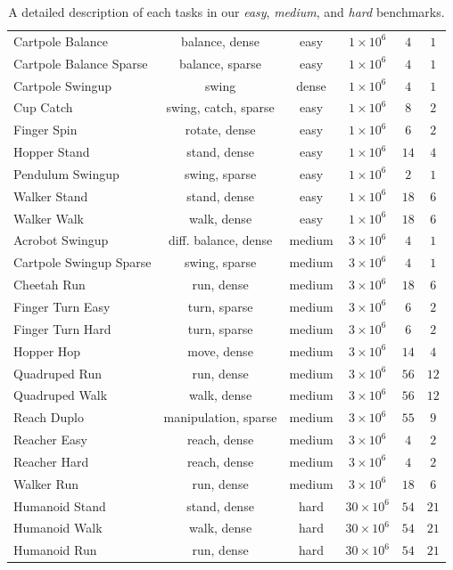 \begin{table}[!h]
\begin{tabular}{lccccc}
\hline
Cartpole Balance & balance, dense & easy & $1\times 10^6$  & $4$ & $1$  \\
Cartpole Balance Sparse & balance, sparse & easy & $1\times 10^6$  & $4$ & $1$  \\
Cartpole Swingup & swing & dense & $1\times 10^6$  & $4$ & $1$ \\
Cup Catch & swing, catch, sparse & easy & $1\times 10^6$  & $8$ & $2$ \\
Finger Spin & rotate, dense & easy & $1\times 10^6$  & $6$ & $2$ \\
Hopper Stand & stand, dense & easy & $1\times 10^6$  & $14$ & $4$ \\
Pendulum Swingup & swing, sparse & easy & $1\times 10^6$  & $2$ & $1$ \\
Walker Stand  & stand, dense & easy & $1\times 10^6$  & $18$ & $6$\\
Walker Walk  & walk, dense & easy & $1\times 10^6$  & $18$ & $6$ \\
\hline 
Acrobot Swingup & diff. balance, dense & medium & $3\times 10^6$  & $4$ & $1$  \\
Cartpole Swingup Sparse & swing, sparse & medium & $3\times 10^6$  & $4$ & $1$  \\
Cheetah Run & run, dense & medium & $3\times 10^6$  & $18$ & $6$  \\
Finger Turn Easy & turn, sparse & medium & $3\times 10^6$  & $6$ & $2$  \\
Finger Turn Hard & turn, sparse & medium & $3\times 10^6$  & $6$ & $2$  \\
Hopper Hop & move, dense & medium & $3\times 10^6$  & $14$ & $4$  \\
Quadruped Run & run, dense & medium & $3\times 10^6$  & $56$ & $12$  \\
Quadruped Walk & walk, dense & medium & $3\times 10^6$  & $56$ & $12$  \\
Reach Duplo & manipulation, sparse & medium & $3\times 10^6$  & $55$ & $9$  \\
Reacher Easy & reach, dense & medium & $3\times 10^6$  & $4$ & $2$  \\
Reacher Hard & reach, dense & medium & $3\times 10^6$  & $4$ & $2$  \\
Walker Run & run, dense & medium & $3\times 10^6$  & $18$ & $6$  \\
\hline
Humanoid Stand & stand, dense & hard & $30\times 10^6$  & $54$ & $21$  \\
Humanoid Walk & walk, dense & hard & $30\times 10^6$  & $54$ & $21$  \\
Humanoid Run & run, dense & hard & $30\times 10^6$  & $54$ & $21$  \\


\hline
\end{tabular}
\caption{\label{table:benchamrks} A detailed description of each tasks in our \textit{easy}, \textit{medium}, and \textit{hard} benchmarks.}
\end{table}






